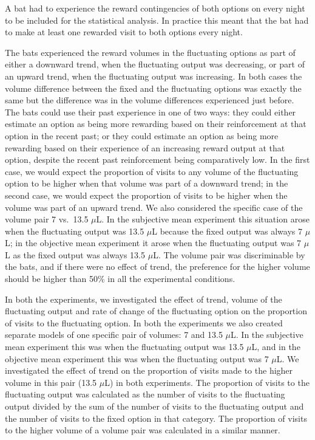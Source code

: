 \documentclass[
]{article}
\begin{document}
A bat had to experience the reward contingencies of both options on every night to be included for the statistical analysis. In practice this meant that the bat had to make at least one rewarded visit to both options every night.

The bats experienced the reward volumes in the fluctuating options as part of either a downward trend, when the fluctuating output was decreasing, or part of an upward trend, when the fluctuating output was increasing. In both cases the volume difference between the fixed and the fluctuating options was exactly the same but the difference was in the volume differences experienced just before. The bats could use their past experience in one of two ways: they could either estimate an option as being more rewarding based on their reinforcement at that option in the recent past; or they could estimate an option as being more rewarding based on their experience of an increasing reward output at that option, despite the recent past reinforcement being comparatively low. In the first case, we would expect the proportion of visits to any volume of the fluctuating option to be higher when that volume was part of a downward trend; in the second case, we would expect the proportion of visits to be higher when the volume was part of an upward trend. We also considered the specific case of the volume pair 7 vs.~13.5 \(\mu\)L. In the subjective mean experiment this situation arose when the fluctuating output was 13.5 \(\mu\)L because the fixed output was always 7 \(\mu\)L; in the objective mean experiment it arose when the fluctuating output was 7 \(\mu\)L as the fixed output was always 13.5 \(\mu\)L. The volume pair was discriminable by the bats, and if there were no effect of trend, the preference for the higher volume should be higher than 50\% in all the experimental conditions.

In both the experiments, we investigated the effect of trend, volume of the fluctuating output and rate of change of the fluctuating option on the proportion of visits to the fluctuating option. In both the experiments we also created separate models of one specific pair of volumes: 7 and 13.5 \(\mu\)L. In the subjective mean experiment this was when the fluctuating output was 13.5 \(\mu\)L, and in the objective mean experiment this was when the fluctuating output was 7 \(\mu\)L. We investigated the effect of trend on the proportion of visits made to the higher volume in this pair (13.5 \(\mu\)L) in both experiments. The proportion of visits to the fluctuating output was calculated as the number of visits to the fluctuating output divided by the sum of the number of visits to the fluctuating output and the number of visits to the fixed option in that category. The proportion of visits to the higher volume of a volume pair was calculated in a similar manner.
\end{document}
